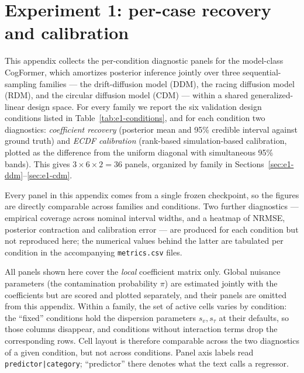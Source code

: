 \renewcommand{\topfraction}{0.92}
\renewcommand{\bottomfraction}{0.7}
\renewcommand{\textfraction}{0.06}
\renewcommand{\floatpagefraction}{0.6}

\section{Experiment 1: per-case recovery and calibration}
\label{app:experiment-1-figures}

This appendix collects the per-condition diagnostic panels for the model-class
CogFormer, which amortizes posterior inference jointly over three
sequential-sampling families --- the drift-diffusion model (DDM), the racing
diffusion model (RDM), and the circular diffusion model (CDM) --- within a
shared generalized-linear design space. For every family we report the six
validation design conditions listed in Table~\ref{tab:e1-conditions}, and for
each condition two diagnostics: \emph{coefficient recovery} (posterior mean and
95\% credible interval against ground truth) and \emph{ECDF calibration}
(rank-based simulation-based calibration, plotted as the difference from the
uniform diagonal with simultaneous 95\% bands). This gives
$3 \times 6 \times 2 = 36$ panels, organized by family in
Sections~\ref{sec:e1-ddm}--\ref{sec:e1-cdm}.

Every panel in this appendix comes from a single frozen checkpoint, so the
figures are directly comparable across families and conditions. Two further
diagnostics --- empirical coverage across nominal interval widths, and a
heatmap of NRMSE, posterior contraction and calibration error --- are produced
for each condition but not reproduced here; the numerical values behind the
latter are tabulated per condition in the accompanying \texttt{metrics.csv}
files.

All panels shown here cover the \emph{local} coefficient matrix only. Global
nuisance parameters (the contamination probability $\pi$) are estimated jointly
with the coefficients but are scored and plotted separately, and their panels
are omitted from this appendix. Within a family, the set of active cells varies
by condition: the ``fixed'' conditions hold the dispersion parameters
$s_v, s_\tau$ at their defaults, so those columns disappear, and conditions
without interaction terms drop the corresponding rows. Cell layout is therefore
comparable across the two diagnostics of a given condition, but not across
conditions. Panel axis labels read \texttt{predictor|category}; ``predictor''
there denotes what the text calls a regressor.

